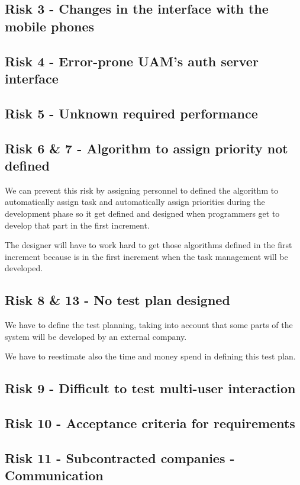 \documentclass[11pt]{report}
\begin{document}
\subsection{Risk 3 - Changes in the interface with the mobile phones}
\subsection{Risk 4 - Error-prone UAM's auth server interface}
\subsection{Risk 5 - Unknown required performance}
\subsection{Risk 6 \& 7 - Algorithm to assign priority not defined}
We can prevent this risk by assigning personnel to defined the algorithm to automatically assign task and automatically assign priorities during the development phase so it get defined and designed when programmers get to develop that part in the first increment. 

The designer will have to work hard to get those algorithms defined in the first increment because is in the first increment when the task management will be developed.

\subsection{Risk 8 \& 13 - No test plan designed}
We have to define the test planning, taking into account that some parts of the system will be developed by an external company. 

We have to reestimate also the time and money spend in defining this test plan.

\subsection{Risk 9 - Difficult to test multi-user interaction}

\subsection{Risk 10 - Acceptance criteria for requirements}
\subsection{Risk 11 - Subcontracted companies - Communication}
\end{document}
